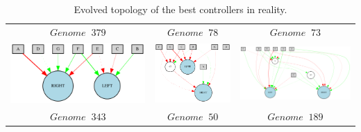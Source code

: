 \begin{table}[h]
\begin{tabular}{ccc}
$$Genome \;  \; 379$$  & $$Genome \;  \; 78$$  & $Genome \;  \; 73$  \\
\includegraphics[scale=0.4]{include/images/thymio_network_343.PNG} & \includegraphics[scale=0.4]{include/images/thymio_network_50.PNG} & \includegraphics[scale=0.4]{include/images/thymio_network_189.PNG} \\
$Genome \;  \; 343$  & $Genome \;  \; 50$  & $Genome \;  \; 189$  \\
\end{tabular}
\caption{Evolved topology of the best controllers in reality.}
\label{fig:thymio_network_topologies} %
\end{table}

